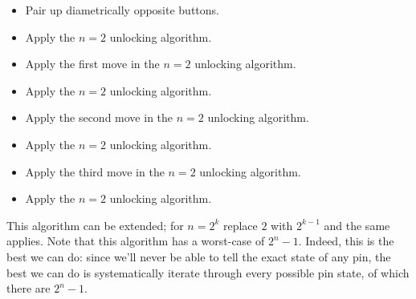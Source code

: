 \begin{solution}
    \newpage\begin{itemize}[noitemsep]
        \item Pair up diametrically opposite buttons. 
        \item Apply the $n = 2$ unlocking algorithm. 
        \item Apply the first move in the $n = 2$ unlocking algorithm. 
        \item Apply the $n = 2$ unlocking algorithm.
        \item Apply the second move in the $n = 2$ unlocking algorithm.
        \item Apply the $n = 2$ unlocking algorithm.
        \item Apply the third move in the $n = 2$ unlocking algorithm.
        \item Apply the $n = 2$ unlocking algorithm.
    \end{itemize}

    This algorithm can be extended; for $n = 2^k$ replace $2$ with $2^{k - 1}$ and the same applies. 
    Note that this algorithm has a worst-case of $2^n - 1$. Indeed, this is the best we can do: since we'll 
    never be able to tell the exact state of any pin, the best we can do is systematically iterate 
    through every possible pin state, of which there are $2^n - 1$. 
\end{solution}\bigskip

